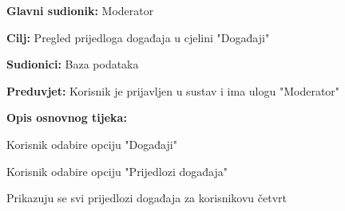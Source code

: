 					\begin{packed_item}
	
						\item \textbf{Glavni sudionik: }Moderator
						\item  \textbf{Cilj:} Pregled prijedloga događaja u cjelini "Događaji"
						\item  \textbf{Sudionici:} Baza podataka
						\item  \textbf{Preduvjet:} Korisnik je prijavljen u sustav i ima ulogu "Moderator"
						\item  \textbf{Opis osnovnog tijeka:}
						
						\item[] \begin{packed_enum}
	
							\item Korisnik odabire opciju "Događaji" 
							\item Korisnik odabire opciju "Prijedlozi događaja" 
							\item Prikazuju se svi prijedlozi događaja za korisnikovu četvrt
							
						\end{packed_enum}
						\end{packed_item}
						
